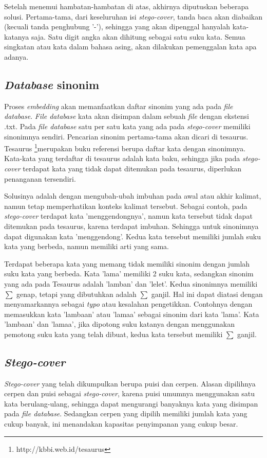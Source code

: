 Setelah menemui hambatan-hambatan di atas, akhirnya diputuskan beberapa solusi. Pertama-tama, dari keseluruhan isi \textit{stego-cover}, tanda baca akan diabaikan (kecuali tanda penghubung '-'), sehingga yang akan dipenggal hanyalah kata-katanya saja. Satu digit angka akan dihitung sebagai satu suku kata. Semua singkatan atau kata dalam bahasa asing, akan dilakukan pemenggalan kata apa adanya.

\subsection{\textit{Database} sinonim}
Proses \textit{embedding} akan memanfaatkan daftar sinonim yang ada pada \textit{file database}. \textit{File database} kata akan disimpan dalam sebuah \textit{file} dengan ekstensi .txt. Pada \textit{file database} satu per satu kata yang ada pada \textit{stego-cover} memiliki sinonimnya sendiri. Pencarian sinonim pertama-tama akan dicari di tesaurus. Tesaurus \footnote{http://kbbi.web.id/tesaurus}merupakan buku referensi berupa daftar kata dengan sinonimnya. Kata-kata yang terdaftar di tesaurus adalah kata baku, sehingga jika pada \textit{stego-cover} terdapat kata yang tidak dapat ditemukan pada tesaurus, diperlukan penanganan tersendiri.

Solusinya adalah dengan mengubah-ubah imbuhan pada awal atau akhir kalimat, namun tetap memperhatikan konteks kalimat tersebut. Sebagai contoh, pada \textit{stego-cover} terdapat kata 'menggendongnya', namun kata tersebut tidak dapat ditemukan pada tesaurus, karena terdapat imbuhan. Sehingga untuk sinonimnya dapat digunakan kata 'menggendong'. Kedua kata tersebut memiliki jumlah suku kata yang berbeda, namun memiliki arti yang sama.

Terdapat beberapa kata yang memang tidak memiliki sinonim dengan jumlah suku kata yang berbeda. Kata 'lama' memiliki 2 suku kata, sedangkan sinonim yang ada pada Tesaurus adalah 'lamban' dan 'lelet'. Kedua sinonimnya memiliki $\sum$ genap, tetapi yang dibutuhkan adalah $\sum$ ganjil. Hal ini dapat diatasi dengan menyamarkannya sebagai \textit{typo} atau kesalahan pengetikkan. Contohnya dengan memasukkan kata 'lambaan' atau 'lamaa' sebagai sinonim dari kata 'lama'. Kata 'lambaan' dan 'lamaa', jika dipotong suku katanya dengan menggunakan pemotong suku kata yang telah dibuat, kedua kata tersebut memiliki $\sum$ ganjil.

\subsection{\textit{Stego-cover}}
\textit{Stego-cover} yang telah dikumpulkan berupa puisi dan cerpen. Alasan dipilihnya cerpen dan puisi sebagai \textit{stego-cover}, karena puisi umumnya menggunakan satu kata berulang-ulang, sehingga dapat mengurangi banyaknya kata yang disimpan pada \textit{file database}. Sedangkan cerpen yang dipilih memiliki jumlah kata yang cukup banyak, ini menandakan kapasitas penyimpanan yang cukup besar.

